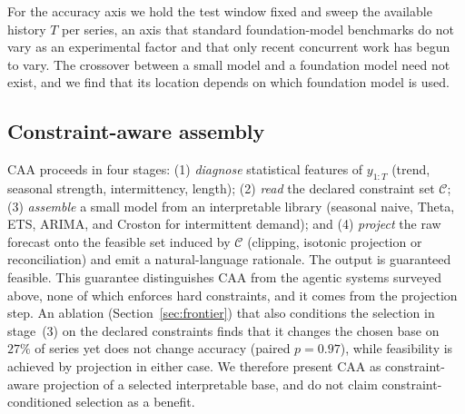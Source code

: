 \documentclass[review,number]{elsarticle}
\begin{document}
For the accuracy axis we hold the test window fixed and sweep the available history
$T$ per series, an axis that standard foundation-model benchmarks do not vary as an
experimental factor and that only recent concurrent work has begun to vary. The crossover between a small
model and a foundation model need not exist, and we find that its location depends on
which foundation model is used.

\subsection{Constraint-aware assembly}
\label{sec:caa}
CAA proceeds in four stages: (1) \emph{diagnose} statistical features of $y_{1:T}$
(trend, seasonal strength, intermittency, length); (2) \emph{read} the declared
constraint set $\mathcal{C}$; (3) \emph{assemble} a small model from an
interpretable library (seasonal naive, Theta, ETS, ARIMA, and Croston for intermittent
demand); and (4) \emph{project} the
raw forecast onto the feasible set induced by $\mathcal{C}$ (clipping, isotonic
projection or reconciliation) and emit a natural-language rationale. The output is
guaranteed feasible. This guarantee distinguishes CAA from
the agentic systems surveyed above, none of which enforces hard constraints, and it
comes from the projection step. An ablation (Section~\ref{sec:frontier}) that
also conditions the selection in stage~(3) on the declared constraints finds that it
changes the chosen base on $27\%$ of series yet does not change accuracy
(paired $p=0.97$), while feasibility is achieved by projection in either case. We
therefore present CAA as constraint-aware projection of a selected
interpretable base, and do not claim constraint-conditioned selection as a benefit.
\end{document}
